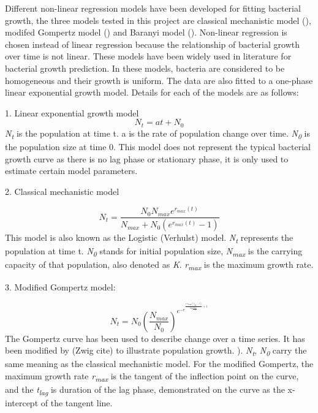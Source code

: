 \documentclass[11pt]{article}
\begin{document}
Different non-linear regression models have been developed for fitting bacterial growth, the three models tested in this project are classical mechanistic model (\cite{verhulst1838notice}), modifed Gompertz model (\cite{PMID:16348228}) and Baranyi model (\cite{BARANYI1994277}). Non-linear regression is chosen instead of linear regression because the relationship of bacterial growth over time is not linear. These models have been widely used in literature for bacterial growth prediction. In these models, bacteria are considered to be homogeneous and their growth is uniform. The data are also fitted to a one-phase linear exponential growth model. Details for each of the models are as follows:

1. Linear exponential growth model
\begin{equation}
    N_{t} = at + N_{0}
\end{equation}
\emph{N\textsubscript{t}} is the population at time t. a is the rate of population change over time. \emph{N\textsubscript{0}} is the population size at time 0. This model does not represent the typical bacterial growth curve as there is no lag phase or stationary phase, it is only used to estimate certain model parameters. 

2. Classical mechanistic model

\begin{equation}
    N_{t} = \frac{N_{0} N_{max}  e^{r_{max}(t)}} {N_{max} + N_{0}  (e^{r_{max}(t)} - 1)}
\end{equation}
This model is also known as the Logistic (Verhulst) model. \emph{N\textsubscript{t}} represents the population at time t.  \emph{N\textsubscript{0}} stands for initial population size,  \emph{N\textsubscript{max}} is the carrying capacity of that population, also denoted as \emph{K}. \emph{r\textsubscript{max}} is the maximum growth rate. 

3. Modified Gompertz model:

\begin{equation}
    N_{t} = N_{0}(\frac{N_{max}}{N_{0}}) ^ {e ^ {-e ^ {\frac{e ^1 r_{max}(t_{lag} - t)}{log\frac{N_{max}}{N_{0}}} + 1}}}
\end{equation}
The Gompertz curve has been used to describe change over a time series. It has been modified by (Zwig cite) to illustrate population growth. ). \emph{N\textsubscript{t}}, \emph{N\textsubscript{0}} carry the same meaning as the classical mechanistic model. For the modified Gompertz, the maximum growth rate \emph{r\textsubscript{max}} is the tangent of the inflection point on the curve, and the \emph{t\textsubscript{lag}} is duration of the lag phase, demonstrated on the curve as the x-intercept of the tangent line. 
\end{document}
